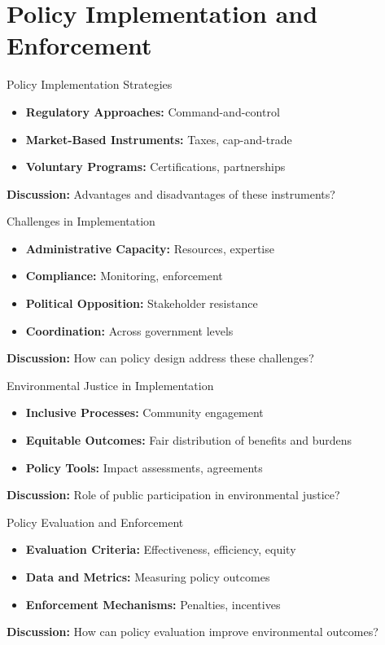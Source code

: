 \documentclass[11pt, aspectratio=169]{beamer}
\begin{document}
\section{Policy Implementation and Enforcement}

\begin{frame}{Policy Implementation Strategies}
    \begin{itemize}
        \item \textbf{Regulatory Approaches:} Command-and-control
        \item \textbf{Market-Based Instruments:} Taxes, cap-and-trade
        \item \textbf{Voluntary Programs:} Certifications, partnerships
    \end{itemize}
    \pause
    \textbf{Discussion:} Advantages and disadvantages of these instruments?
\end{frame}

\begin{frame}{Challenges in Implementation}
    \begin{itemize}
        \item \textbf{Administrative Capacity:} Resources, expertise
        \item \textbf{Compliance:} Monitoring, enforcement
        \item \textbf{Political Opposition:} Stakeholder resistance
        \item \textbf{Coordination:} Across government levels
    \end{itemize}
    \pause
    \textbf{Discussion:} How can policy design address these challenges?
\end{frame}

\begin{frame}{Environmental Justice in Implementation}
    \begin{itemize}
        \item \textbf{Inclusive Processes:} Community engagement
        \item \textbf{Equitable Outcomes:} Fair distribution of benefits and burdens
        \item \textbf{Policy Tools:} Impact assessments, agreements
    \end{itemize}
    \pause
    \textbf{Discussion:} Role of public participation in environmental justice?
\end{frame}

\begin{frame}{Policy Evaluation and Enforcement}
    \begin{itemize}
        \item \textbf{Evaluation Criteria:} Effectiveness, efficiency, equity
        \item \textbf{Data and Metrics:} Measuring policy outcomes
        \item \textbf{Enforcement Mechanisms:} Penalties, incentives
    \end{itemize}
    \pause
    \textbf{Discussion:} How can policy evaluation improve environmental outcomes?
\end{frame}
\end{document}
